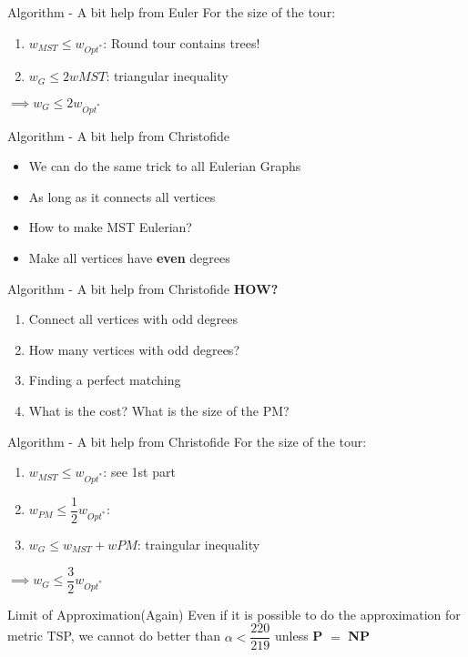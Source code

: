 \documentclass{beamer}
\begin{document}
\begin{frame}{Algorithm - A bit help from Euler}
    For the size of the tour:
    \begin{enumerate}
        \item $w_{MST} \leq w_{Opt^*}$: Round tour contains trees!
        \item $w_G \leq 2w{MST}$: triangular inequality
    \end{enumerate}
    $\implies w_G \leq 2w_{Opt^*}$ 
\end{frame}

\begin{frame}{Algorithm - A bit help from Christofide}
\begin{itemize}
    \item<1-> We can do the same trick to all Eulerian Graphs
    \item<2-> As long as it connects all vertices 
    \item<3-> How to make MST Eulerian?
    \item<4-> Make all vertices have \textbf{even} degrees
\end{itemize}
\end{frame}

\begin{frame}{Algorithm - A bit help from Christofide}
    \textbf{HOW?}
    \begin{enumerate}
        \item<1-> Connect all vertices with odd degrees
        \item<2-> How many vertices with odd degrees?
        \item<3-> Finding a perfect matching
        \item<4-> What is the cost? What is the size of the PM?
    \end{enumerate}
\end{frame}

\begin{frame}{Algorithm - A bit help from Christofide}
    For the size of the tour:
    \begin{enumerate}
        \item $w_{MST} \leq w_{Opt^*}$: see 1st part
        \item $w_{PM} \leq \dfrac{1}{2} w_{Opt^*}$:
        \item $w_{G} \leq w_{MST} + w{PM}$: traingular inequality
    \end{enumerate}
    $\implies w_{G} \leq \dfrac{3}{2} w_{Opt^*}$
\end{frame}

\begin{frame}{Limit of Approximation(Again)}
    Even if it is possible to do the approximation for metric TSP, we cannot do better than $\alpha < \dfrac{220}{219}$
    unless \textbf{P} $=$ \textbf{NP}
\end{frame}
\end{document}
